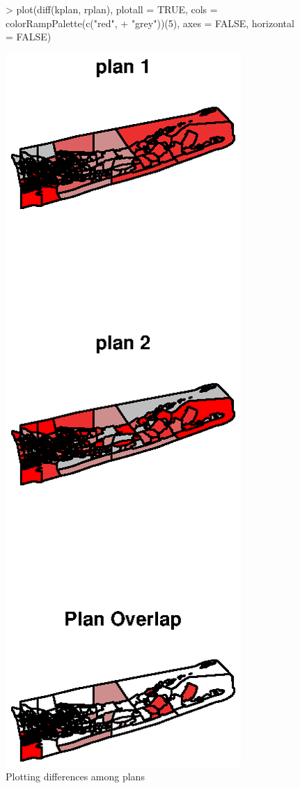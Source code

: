 \documentclass[article]{JSSstyle/jss}
\begin{document}
  \begin{figure}[!h]
  
\begin{Schunk}
\begin{Sinput}
> plot(diff(kplan, rplan), plotall = TRUE, cols = colorRampPalette(c("red", 
+     "grey"))(5), axes = FALSE, horizontal = FALSE)
\end{Sinput}
\end{Schunk}
\includegraphics{bardJSS-plot2a}
  \caption{\label{fig:rplot2} Plotting differences among plans}
  \end{figure}
  
\end{document}
